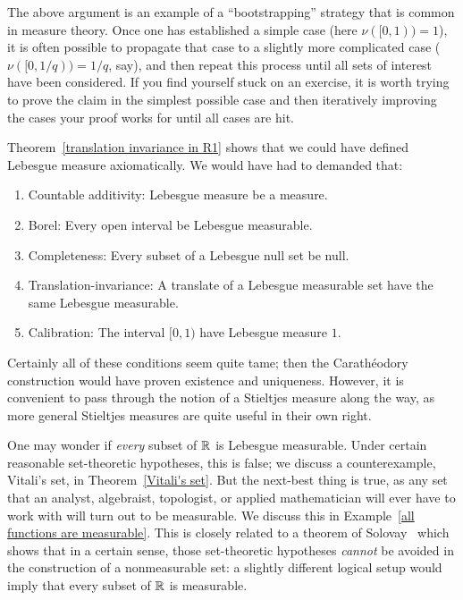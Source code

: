 \begin{subsec}
The above argument is an example of a ``bootstrapping'' strategy that is common in measure theory.
Once one has established a simple case (here $\nu([0, 1)) = 1$), it is often possible to propagate that case to a slightly more complicated case ($\nu([0, 1/q)) = 1/q$, say), and then repeat this process until all sets of interest have been considered.
If you find yourself stuck on an exercise, it is worth trying to prove the claim in the simplest possible case and then iteratively improving the cases your proof works for until all cases are hit.
\end{subsec}

\begin{subsec}
Theorem~\ref{translation invariance in R1} shows that we could have defined Lebesgue measure axiomatically. We would have had to demanded that:
\begin{enumerate}
\item Countable additivity: Lebesgue measure be a measure.
\item Borel: Every open interval be Lebesgue measurable.
\item Completeness: Every subset of a Lebesgue null set be null.
\item Translation-invariance: A translate of a Lebesgue measurable set have the same Lebesgue measurable.
\item Calibration: The interval $[0, 1)$ have Lebesgue measure $1$.
\end{enumerate}
Certainly all of these conditions seem quite tame; then the Carathéodory construction would have proven existence and uniqueness.
However, it is convenient to pass through the notion of a Stieltjes measure along the way, as more general Stieltjes measures are quite useful in their own right.
\end{subsec}

\begin{subsec}
One may wonder if \emph{every} subset of $\mathbb{R}$ is Lebesgue measurable.
Under certain reasonable set-theoretic hypotheses, this is false; we discuss a counterexample, Vitali's set, in Theorem~\ref{Vitali's set}.
But the next-best thing is true, as any set that an analyst, algebraist, topologist, or applied mathematician will ever have to work with will turn out to be measurable. We discuss this in Example~\ref{all functions are measurable}.
This is closely related to a theorem of Solovay~\cite{Solovay1970} which shows that in a certain sense, those set-theoretic hypotheses \emph{cannot} be avoided in the construction of a nonmeasurable set: a slightly different logical setup would imply that every subset of $\mathbb{R}$ is measurable.
\end{subsec}

